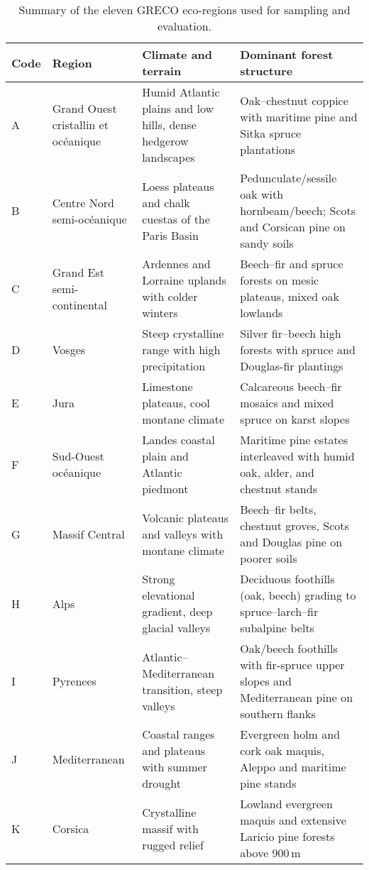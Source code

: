 \documentclass[utf8]{FrontiersinHarvard}
\begin{document}
\begin{table}[H]
    \centering
    \small
    \begin{tabular}{p{0.9cm}p{3.2cm}p{4.1cm}p{5.2cm}}
        \toprule
        \textbf{Code} & \textbf{Region} & \textbf{Climate and terrain} & \textbf{Dominant forest structure} \\
        \midrule
        A & Grand Ouest cristallin et océanique & Humid Atlantic plains and low hills, dense hedgerow landscapes & Oak–chestnut coppice with maritime pine and Sitka spruce plantations \\
        B & Centre Nord semi-océanique & Loess plateaus and chalk cuestas of the Paris Basin & Pedunculate/sessile oak with hornbeam/beech; Scots and Corsican pine on sandy soils \\
        C & Grand Est semi-continental & Ardennes and Lorraine uplands with colder winters & Beech–fir and spruce forests on mesic plateaus, mixed oak lowlands \\
        D & Vosges & Steep crystalline range with high precipitation & Silver fir–beech high forests with spruce and Douglas-fir plantings \\
        E & Jura & Limestone plateaus, cool montane climate & Calcareous beech–fir mosaics and mixed spruce on karst slopes \\
        F & Sud-Ouest océanique & Landes coastal plain and Atlantic piedmont & Maritime pine estates interleaved with humid oak, alder, and chestnut stands \\
        G & Massif Central & Volcanic plateaus and valleys with montane climate & Beech–fir belts, chestnut groves, Scots and Douglas pine on poorer soils \\
        H & Alps & Strong elevational gradient, deep glacial valleys & Deciduous foothills (oak, beech) grading to spruce–larch–fir subalpine belts \\
        I & Pyrenees & Atlantic–Mediterranean transition, steep valleys & Oak/beech foothills with fir-spruce upper slopes and Mediterranean pine on southern flanks \\
        J & Mediterranean & Coastal ranges and plateaus with summer drought & Evergreen holm and cork oak maquis, Aleppo and maritime pine stands \\
        K & Corsica & Crystalline massif with rugged relief & Lowland evergreen maquis and extensive Laricio pine forests above 900\,m \\
        \bottomrule
    \end{tabular}
    \caption{Summary of the eleven GRECO eco-regions used for sampling and evaluation.}
    \label{tab:greco_summary}
\end{table}
\end{document}
